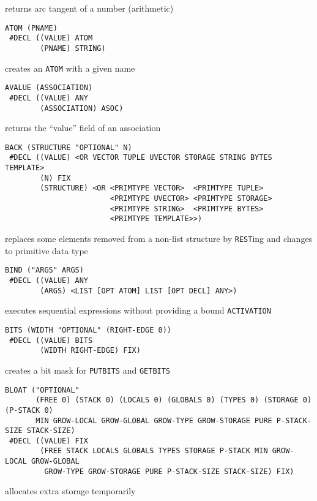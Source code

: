 \documentclass[a4paper,]{article}
\begin{document}
returns arc tangent of a number (arithmetic)

\begin{verbatim}
ATOM (PNAME)
 #DECL ((VALUE) ATOM
        (PNAME) STRING)
\end{verbatim}

creates an \texttt{ATOM} with a given name

\begin{verbatim}
AVALUE (ASSOCIATION)
 #DECL ((VALUE) ANY
        (ASSOCIATION) ASOC)
\end{verbatim}

returns the ``value'' field of an association

\begin{verbatim}
BACK (STRUCTURE "OPTIONAL" N)
 #DECL ((VALUE) <OR VECTOR TUPLE UVECTOR STORAGE STRING BYTES TEMPLATE>
        (N) FIX
        (STRUCTURE) <OR <PRIMTYPE VECTOR>  <PRIMTYPE TUPLE>
                        <PRIMTYPE UVECTOR> <PRIMTYPE STORAGE>
                        <PRIMTYPE STRING>  <PRIMTYPE BYTES>
                        <PRIMTYPE TEMPLATE>>)
\end{verbatim}

replaces some elements removed from a non-list structure by \texttt{REST}ing and changes to primitive data type

\begin{verbatim}
BIND ("ARGS" ARGS)
 #DECL ((VALUE) ANY
        (ARGS) <LIST [OPT ATOM] LIST [OPT DECL] ANY>)
\end{verbatim}

executes sequential expressions without providing a bound \texttt{ACTIVATION}

\begin{verbatim}
BITS (WIDTH "OPTIONAL" (RIGHT-EDGE 0))
 #DECL ((VALUE) BITS
        (WIDTH RIGHT-EDGE) FIX)
\end{verbatim}

creates a bit mask for \texttt{PUTBITS} and \texttt{GETBITS}

\begin{verbatim}
BLOAT ("OPTIONAL"
       (FREE 0) (STACK 0) (LOCALS 0) (GLOBALS 0) (TYPES 0) (STORAGE 0) (P-STACK 0)
       MIN GROW-LOCAL GROW-GLOBAL GROW-TYPE GROW-STORAGE PURE P-STACK-SIZE STACK-SIZE)
 #DECL ((VALUE) FIX
        (FREE STACK LOCALS GLOBALS TYPES STORAGE P-STACK MIN GROW-LOCAL GROW-GLOBAL
         GROW-TYPE GROW-STORAGE PURE P-STACK-SIZE STACK-SIZE) FIX)
\end{verbatim}

allocates extra storage temporarily
\end{document}
